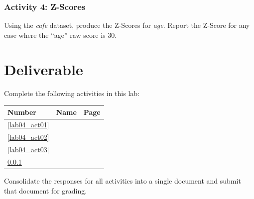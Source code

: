 \subsubsection{Activity 4: Z-Scores} \label{lab04_act04}

Using the \textit{cafe} dataset, produce the Z-Scores for \textit{age}. Report the Z-Score for any case where the ``age'' raw score is $ 30 $. 

\section{Deliverable}

Complete the following activities in this lab:

\begin{center}
  \begin{tabular}{lll}
    \hline 
    \textbf{Number} & \textbf{Name} & \textbf{Page} \\ 
    \hline 
    \ref{lab04_act01} & \nameref{lab04_act01} & \pageref{lab04_act01} \\ 
    \ref{lab04_act02} & \nameref{lab04_act02} & \pageref{lab04_act02} \\ 
    \ref{lab04_act03} & \nameref{lab04_act03} & \pageref{lab04_act03} \\ 
    \ref{lab04_act04} & \nameref{lab04_act04} & \pageref{lab04_act04} \\ 
    \hline 
  \end{tabular} 
\end{center}

Consolidate the responses for all activities into a single document and submit that document for grading.


